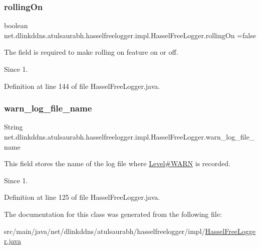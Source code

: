 \subsubsection{\texorpdfstring{rolling\+On}{rollingOn}}
{\footnotesize\ttfamily boolean net.\+dlinkddns.\+atulsaurabh.\+hasselfreelogger.\+impl.\+Hassel\+Free\+Logger.\+rolling\+On =false\hspace{0.3cm}{\ttfamily [private]}}

The field is required to make rolling on feature on or off. \begin{DoxySince}{Since}
1. 
\end{DoxySince}


Definition at line 144 of file Hassel\+Free\+Logger.\+java.

\mbox{\label{classnet_1_1dlinkddns_1_1atulsaurabh_1_1hasselfreelogger_1_1impl_1_1_hassel_free_logger_a697e12961052a566e13c8ae48248cce9}} 
\subsubsection{\texorpdfstring{warn\+\_\+log\+\_\+file\+\_\+name}{warn\_log\_file\_name}}
{\footnotesize\ttfamily String net.\+dlinkddns.\+atulsaurabh.\+hasselfreelogger.\+impl.\+Hassel\+Free\+Logger.\+warn\+\_\+log\+\_\+file\+\_\+name\hspace{0.3cm}{\ttfamily [private]}}

This field stores the name of the log file where \mbox{\hyperlink{}{Level\#\+W\+A\+RN}} is recorded. \begin{DoxySince}{Since}
1. 
\end{DoxySince}


Definition at line 125 of file Hassel\+Free\+Logger.\+java.



The documentation for this class was generated from the following file\+:\begin{DoxyCompactItemize}
\item 
src/main/java/net/dlinkddns/atulsaurabh/hasselfreelogger/impl/\mbox{\hyperlink{_hassel_free_logger_8java}{Hassel\+Free\+Logger.\+java}}\end{DoxyCompactItemize}
